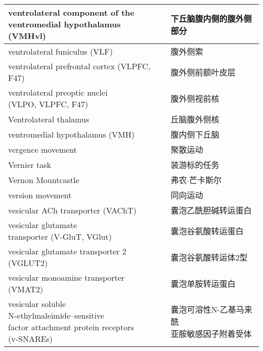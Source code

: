 \begin{longtable}{lll}
	\midrule
	\makecell[l]{ventrolateral component of the \\ventromedial hypothalamus (VMHvl)}  && 下丘脑腹内侧的腹外侧部分  \\
	
	\midrule
	ventrolateral funiculus (VLF)   && 腹外侧索  \\
	
	\midrule
	ventrolateral prefrontal cortex (VLPFC, F47)   && 腹外侧前额叶皮层  \\
	
	\midrule
	\makecell[l]{ventrolateral preoptic nuclei\\ (VLPO, VLPFC, F47)}  && 腹外侧视前核  \\
	
	\midrule
	Ventrolateral thalamus   && 丘脑腹外侧核  \\
	
	\midrule
	ventromedial hypothalamus (VMH)  && 腹内侧下丘脑  \\
	
	\midrule
	vergence movement   && 聚散运动  \\
	
	\midrule
	Vernier task   && 装游标的任务  \\
	
	\midrule
	Vernon Mountcastle   && 弗农$\cdot$芒卡斯尔  \\
	
	\midrule
	version movement   && 同向运动  \\
	
	\midrule
	vesicular ACh transporter (VAChT)   && 囊泡乙酰胆碱转运蛋白  \\
	
	\midrule
	\makecell[l]{vesicular glutamate \\transporter (V-GluT, VGlut)}   && 囊泡谷氨酸转运蛋白  \\
	
	\midrule
	vesicular glutamate transporter 2 (VGLUT2)   && 囊泡谷氨酸转运体2型  \\
	
	\midrule
	vesicular monoamine transporter (VMAT2)   && 囊泡单胺转运蛋白  \\
	
	\midrule
	\makecell[l]{vesicular soluble \\N-ethylmaleimide–sensitive \\factor attachment protein receptors\\ (v-SNAREs)}  && \makecell[l]{囊泡可溶性N-乙基马来酰\\亚胺敏感因子附着受体}  \\
	

\end{longtable}

